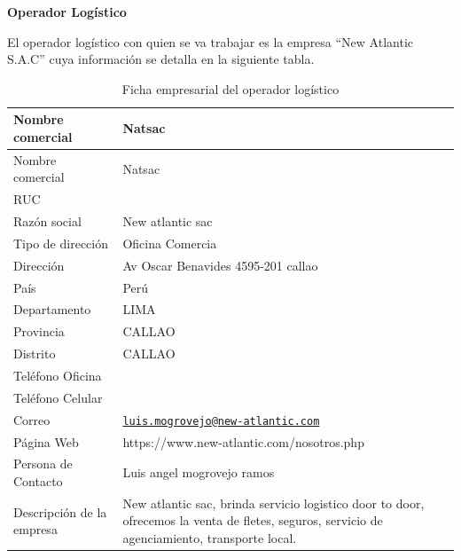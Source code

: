 \documentclass[
  stu,
  floatsintext,
  longtable,
  a4paper,
  nolmodern,
  notxfonts,
  notimes,
  colorlinks=true,linkcolor=blue,citecolor=blue,urlcolor=blue]{apa7}
\begin{document}
\textbf{Operador Logístico}

El operador logístico con quien se va trabajar es la empresa ``New
Atlantic S.A.C'' cuya información se detalla en la siguiente tabla.

\begin{longtable}[]{@{}
  >{\raggedright\arraybackslash}p{}
  >{\raggedright\arraybackslash}p{}@{}}
\caption{Ficha empresarial del operador logístico}\tabularnewline
\toprule\noalign{}
\begin{minipage}[b]{\linewidth}\raggedright
Nombre comercial
\end{minipage} & \begin{minipage}[b]{\linewidth}\raggedright
Natsac
\end{minipage} \\
\midrule\noalign{}
\endfirsthead
\toprule\noalign{}
\begin{minipage}[b]{\linewidth}\raggedright
Nombre comercial
\end{minipage} & \begin{minipage}[b]{\linewidth}\raggedright
Natsac
\end{minipage} \\
\midrule\noalign{}
\endhead
\bottomrule\noalign{}
\endlastfoot
RUC & 20562763351 \\
Razón social & New atlantic sac \\
Tipo de dirección & Oficina Comercia \\
Dirección & Av Oscar Benavides 4595-201 callao \\
País & Perú \\
Departamento & LIMA \\
Provincia & CALLAO \\
Distrito & CALLAO \\
Teléfono Oficina & 14697815 \\
Teléfono Celular & 981366393 \\
Correo &
\href{mailto:luis.mogrovejo@new-atlantic.com}{\nolinkurl{luis.mogrovejo@new-atlantic.com}} \\
Página Web & https://www.new-atlantic.com/nosotros.php \\
Persona de Contacto & Luis angel mogrovejo ramos \\
Descripción de la empresa & New atlantic sac, brinda servicio logistico
door to door, ofrecemos la venta de fletes, seguros, servicio de
agenciamiento, transporte local. \\
\end{longtable}
\end{document}
